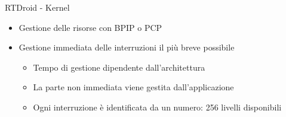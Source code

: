 \begin{frame}{RTDroid - Kernel}
{\begin{itemize}
\begin{itemize}
\begin{itemize}
				\item 256 livelli di priorità
			\end{itemize}
			\item Gestione delle risorse con BPIP o PCP
			\item Gestione immediata delle interruzioni il più breve possibile
			\begin{itemize}
				\item Tempo di gestione dipendente dall'architettura
				\item La parte non immediata viene gestita dall'applicazione
				\item Ogni interruzione è identificata da un numero: 256 livelli disponibili
			\end{itemize}
		\end{itemize}
	\end{itemize}}
\end{frame}